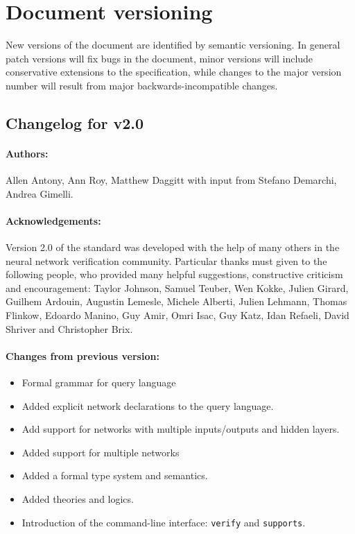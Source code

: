 \section{Document versioning}

New versions of the document are identified by semantic versioning. In general patch versions will fix bugs in the document, minor versions will include conservative extensions to the specification, while changes to the major version number will result from major backwards-incompatible changes.

\subsection*{Changelog for v2.0}

\paragraph{Authors:} Allen Antony, Ann Roy, Matthew Daggitt with input from Stefano Demarchi, Andrea Gimelli.

\noindent \paragraph{Acknowledgements:} Version 2.0 of the standard was developed with the help of many others in the neural network verification community.
Particular thanks must given to the following people, who provided many helpful suggestions, constructive criticism and encouragement: Taylor Johnson, Samuel Teuber, Wen Kokke, Julien Girard, Guilhem Ardouin, Augustin Lemesle, Michele Alberti, Julien Lehmann, Thomas Flinkow, Edoardo Manino, Guy Amir, Omri Isac, Guy Katz, Idan Refaeli, David Shriver and Christopher Brix.

\noindent \paragraph{Changes from previous version:}
\begin{itemize}
\item Formal grammar for query language
\item Added explicit network declarations to the query language.
\item Add support for networks with multiple inputs/outputs and hidden layers.
\item Added support for multiple networks
\item Added a formal type system and semantics.
\item Added theories and logics.
\item Introduction of the command-line interface: \texttt{verify} and \texttt{supports}.
\end{itemize}

